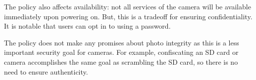 \documentclass{article}
\begin{document}
\begin{homeworkProblem}[1]
      The policy also affects availability: not all services of the camera will be available immediately upon powering on. But, this is a tradeoff for ensuring confidentiality. It is notable that users can opt in to using a password.

      The policy does not make any promises about photo integrity as this is a less important security goal for cameras. For example, confiscating an SD card or camera accomplishes the same goal as scrambling the SD card, so there is no need to ensure authenticity.
  \end{homeworkProblem}
\end{document}
